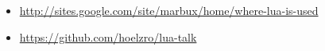 \begin{frame}

\begin{itemize}
\item \url{http://sites.google.com/site/marbux/home/where-lua-is-used}
\item \url{https://github.com/hoelzro/lua-talk}
\end{itemize}

\end{frame}
